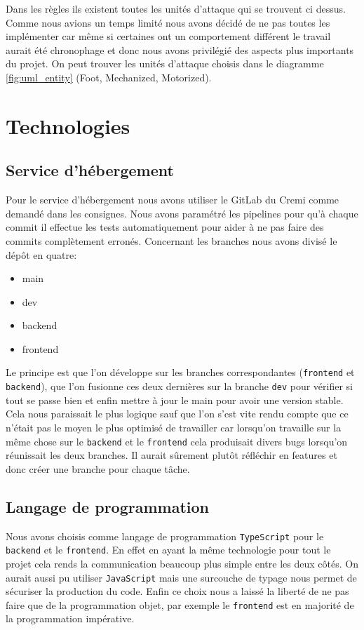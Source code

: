 Dans les règles ils existent toutes les unités d'attaque qui se trouvent ci dessus. Comme nous avions un temps limité nous avons décidé de ne pas toutes les implémenter car même si certaines ont un comportement différent le travail aurait été chronophage et donc nous avons privilégié des aspects plus importants du projet. On peut trouver les unités d'attaque choisis dans le diagramme \ref{fig:uml_entity} (Foot, Mechanized, Motorized).

\section{Technologies}

\subsection{Service d'hébergement}

Pour le service d'hébergement nous avons utiliser le GitLab du Cremi comme demandé dans les consignes. Nous avons paramétré les pipelines pour qu'à chaque commit il effectue les tests automatiquement pour aider à ne pas faire des commits complètement erronés. Concernant les branches nous avons divisé le dépôt en quatre:
\begin{itemize}
    \item main
    \item dev
    \item backend
    \item frontend
\end{itemize}

Le principe est que l'on développe sur les branches correspondantes (\lstinline{frontend} et \lstinline{backend}), que l'on fusionne ces deux dernières sur la branche \lstinline{dev} pour vérifier si tout se passe bien et enfin mettre à jour le main pour avoir une version stable. Cela nous paraissait le plus logique sauf que l'on s'est vite rendu compte que ce n'était pas le moyen le plus optimisé de travailler car lorsqu'on travaille sur la même chose sur le \lstinline{backend} et le \lstinline{frontend} cela produisait divers bugs lorsqu'on réunissait les deux branches. Il aurait sûrement plutôt réfléchir en features et donc créer une branche pour chaque tâche.

\subsection{Langage de programmation}

Nous avons choisis comme langage de programmation \lstinline{TypeScript} pour le \lstinline{backend} et le \lstinline{frontend}. En effet en ayant la même technologie pour tout le projet cela rends la communication beaucoup plus simple entre les deux côtés. On aurait aussi pu utiliser \lstinline{JavaScript} mais une surcouche de typage nous permet de sécuriser la production du code. Enfin ce choix nous a laissé la liberté de ne pas faire que de la programmation objet, par exemple le \lstinline{frontend} est en majorité de la programmation impérative.

